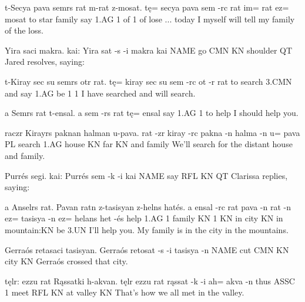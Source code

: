 \documentclass[fontsize=12pt,twoside=false,numbers=noenddot]{class/kaobook}
\newenvironment{example*}{
	\begin{minipage}{164.6mm}%
	\examples%
	\ex%
}{%
	\endexamples%
	\end{minipage}%
}%
\begin{document}
\begin{example*}
\script t-Secya pava semrs rat m-rat z-mosat.
\bits tę= secya pava sem -rc rat im= rat ez= mosat
\gloss to star family say 1.AG 1 of 1 of lose
\tr ... today I myself will tell my family of the loss.
\end{example*}

\begin{example*}
\script Yira saci makra. kai:
\bits Yira sat -s -i makra kai
\gloss NAME go CMN KN shoulder QT
\tr Jared resolves, saying:
\end{example*}

\begin{example*}
\script t-Kiray sec su semrs otr rat.
\bits tę= kiray sec su sem -rc ot -r rat
\gloss to search 3.CMN and say 1.AG be 1 1
\tr I have searched and will search.
\end{example*}

\begin{example*}
\script a Semrs rat t-ensal. 
\bits a sem -rs rat tę= ensal 
 say 1.AG 1 to help 
\tr I should help you. 
\end{example*}

\begin{example*}
\script raczr Kirayrs paknan halman u-pava.
\bits rat -zr kiray -rc pakna -n halma -n u= pava
 PL search 1.AG house KN far KN and family
\tr We'll search for the distant house and family.
\end{example*}

\begin{example*}
\script Purrés segi. kai:
\bits Purrés sem -k -i kai
\gloss NAME say RFL KN QT
\tr Clarissa replies, saying:
\end{example*}

\begin{example*}
\script a Anselrs rat. Pavan ratn z-tasisyan z-helns hatés.
\bits a ensal -rc rat pava -n rat -n ez= tasisya -n ez= helans het -és
 help 1.AG 1 family KN 1 KN in city KN in mountain:KN be 3.UN
\tr I'll help you. My family is in the city in the mountains.
\end{example*}

\begin{example*}
\script Gerraós retasaci tasisyan.
\bits Gerraós retosat -s -i tasisya -n
\gloss NAME cut CMN KN city KN
\tr Gerraós crossed that city.
\end{example*}

\begin{example*}
\script tęlr: ezzu rat Rąssatki h-akvan.
\bits tęlr ezzu rat rąssat -k  -i  ah= akva -n
\gloss thus ASSC 1   meet  RFL KN at valley KN
\tr That's how we all met in the valley.
\end{example*}
\end{document}
